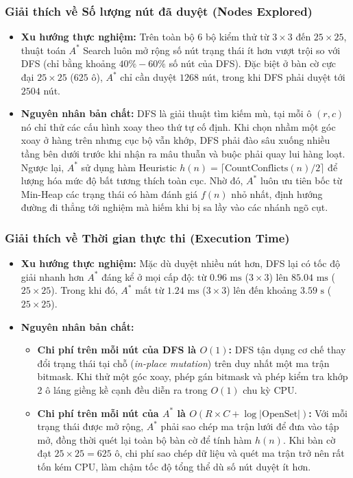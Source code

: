 \documentclass[a4paper]{article}
\begin{document}
\subsubsection{Giải thích về Số lượng nút đã duyệt (Nodes Explored)}
\begin{itemize}
    \item \textbf{Xu hướng thực nghiệm:} Trên toàn bộ 6 bộ kiểm thử từ $3 \times 3$ đến $25 \times 25$, thuật toán $A^*$ Search luôn mở rộng số nút trạng thái ít hơn vượt trội so với DFS (chỉ bằng khoảng $40\% - 60\%$ số nút của DFS). Đặc biệt ở bàn cờ cực đại $25 \times 25$ ($625$ ô), $A^*$ chỉ cần duyệt $1268$ nút, trong khi DFS phải duyệt tới $2504$ nút.
    \item \textbf{Nguyên nhân bản chất:} 
    DFS là giải thuật tìm kiếm mù, tại mỗi ô $(r, c)$ nó chỉ thử các cấu hình xoay theo thứ tự cố định. Khi chọn nhầm một góc xoay ở hàng trên nhưng cục bộ vẫn khớp, DFS phải đào sâu xuống nhiều tầng bên dưới trước khi nhận ra mâu thuẫn và buộc phải quay lui hàng loạt.
    Ngược lại, $A^*$ sử dụng hàm Heuristic $h(n) = \lceil \text{CountConflicts}(n) / 2 \rceil$ để lượng hóa mức độ bất tương thích toàn cục. Nhờ đó, $A^*$ luôn ưu tiên bốc từ Min-Heap các trạng thái có hàm đánh giá $f(n)$ nhỏ nhất, định hướng đường đi thẳng tới nghiệm mà hiếm khi bị sa lầy vào các nhánh ngõ cụt.
\end{itemize}

\subsubsection{Giải thích về Thời gian thực thi (Execution Time)}
\begin{itemize}
    \item \textbf{Xu hướng thực nghiệm:} Mặc dù duyệt nhiều nút hơn, DFS lại có tốc độ giải nhanh hơn $A^*$ đáng kể ở mọi cấp độ: từ $0.96\text{ ms}$ ($3 \times 3$) lên $85.04\text{ ms}$ ($25 \times 25$). Trong khi đó, $A^*$ mất từ $1.24\text{ ms}$ ($3 \times 3$) lên đến khoảng $3.59\text{ s}$ ($25 \times 25$).
    \item \textbf{Nguyên nhân bản chất:}
    \begin{itemize}
        \item \textbf{Chi phí trên mỗi nút của DFS là $O(1)$:} DFS tận dụng cơ chế thay đổi trạng thái tại chỗ (\textit{in-place mutation}) trên duy nhất một ma trận bitmask. Khi thử một góc xoay, phép gán bitmask và phép kiểm tra khớp 2 ô láng giềng kề cạnh đều diễn ra trong $O(1)$ chu kỳ CPU.
        \item \textbf{Chi phí trên mỗi nút của $A^*$ là $O(R \times C + \log |\text{OpenSet}|)$:} Với mỗi trạng thái được mở rộng, $A^*$ phải sao chép ma trận lưới để đưa vào tập mở, đồng thời quét lại toàn bộ bàn cờ để tính hàm $h(n)$. Khi bàn cờ đạt $25 \times 25 = 625$ ô, chi phí sao chép dữ liệu và quét ma trận trở nên rất tốn kém CPU, làm chậm tốc độ tổng thể dù số nút duyệt ít hơn.
    \end{itemize}
\end{itemize}
\end{document}
